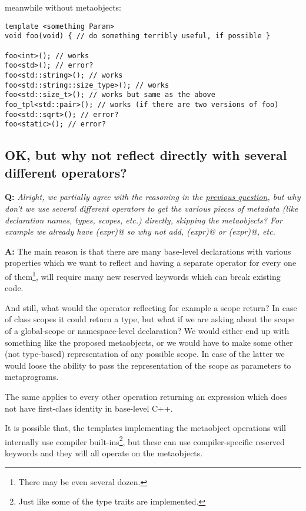 meanwhile without metaobjects:

\begin{verbatim}
template <something Param>
void foo(void) { // do something terribly useful, if possible }

foo<int>(); // works
foo<std>(); // error?
foo<std::string>(); // works
foo<std::string::size_type>(); // works
foo<std::size_t>(); // works but same as the above
foo_tpl<std::pair>(); // works (if there are two versions of foo)
foo<std::sqrt>(); // error?
foo<static>(); // error?
\end{verbatim}

\subsection{OK, but why not reflect directly with several different operators?}

\textbf{Q:} {\em Alright, we partially agree with the reasoning in the
\hyperref[faq-why-metaobjects]{previous question}, but why don't we use several
different operators to get the various pieces of metadata (like declaration names,
types, scopes, etc.) directly, skipping the metaobjects?
For example we already have \verb@decltype(expr)@ so why not add,
\verb@declname(expr)@ or \verb@declscope(expr)@, etc.}

\textbf{A:} The main reason is that there are many base-level declarations
with various properties which we want to reflect and having a separate
operator for every one of them\footnote{There may be even several dozen.},
will require many new reserved keywords which can break existing code.

And still, what would the operator reflecting for example a scope return?
In case of class scopes it could return a type, but what if we are asking
about the scope of a global-scope or namespace-level declaration? We would
either end up with something like the proposed metaobjects,
or we would have to make some other (not type-based) representation of any
possible scope.
In case of the latter we would loose the ability to pass the representation
of the scope as parameters to metaprograms.

The same applies to every other operation returning an expression which does
not have first-class identity in base-level C++.

It is possible that, the templates implementing the metaobject operations
will internally use compiler built-ins\footnote{Just like some of the type traits
are implemented.}, but these can use compiler-specific reserved keywords
and they will all operate on the metaobjects.

